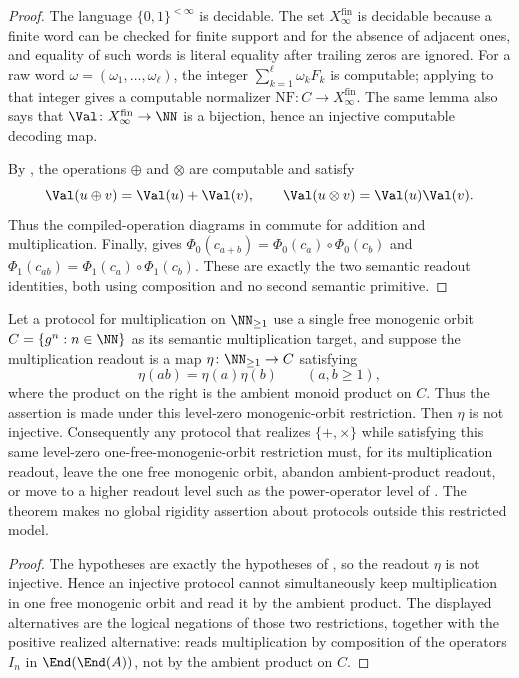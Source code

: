 \begin{proof}
The language \(\{0,1\}^{<\infty}\) is decidable.  The set
\(X_\infty^{\mathrm{fin}}\) is decidable because a finite word can be checked for
finite support and for the absence of adjacent ones, and equality of such words
is literal equality after trailing zeros are ignored.  For a raw word
\(\omega=(\omega_1,\ldots,\omega_\ell)\), the integer
\(\sum_{k=1}^{\ell}\omega_kF_k\) is computable; applying
 to that integer gives a computable
normalizer \(\mathrm{NF}\colon C\to X_\infty^{\mathrm{fin}}\).  The same lemma
also says that \(\Val\colon X_\infty^{\mathrm{fin}}\to\NN\) is a bijection, hence
an injective computable decoding map.

By , the operations \(\oplus\) and
\(\otimes\) are computable and satisfy
\[
  \Val(u\oplus v)=\Val(u)+\Val(v),
  \qquad
  \Val(u\otimes v)=\Val(u)\Val(v).
\]
Thus the compiled-operation diagrams in  commute for
addition and multiplication.  Finally,  gives
\(\Phi_0(c_{a+b})=\Phi_0(c_a)\circ\Phi_0(c_b)\) and
\(\Phi_1(c_{ab})=\Phi_1(c_a)\circ\Phi_1(c_b)\).  These are exactly the two
semantic readout identities, both using composition and no second semantic
primitive.
\end{proof}

\begin{theorem}
\label{thm:restricted-level-zero-protocol-dichotomy}
\label{cor:level-zero-protocol-dichotomy}
Let a protocol for multiplication on \(\NN_{\ge1}\) use a single free
monogenic orbit \(C=\{g^n:n\in\NN\}\) as its semantic multiplication target, and
suppose the multiplication readout is a map
\(\eta\colon\NN_{\ge1}\to C\) satisfying
\[
  \eta(ab)=\eta(a)\eta(b)
  \qquad(a,b\ge1),
\]
where the product on the right is the ambient monoid product on \(C\).  Thus
the assertion is made under this level-zero monogenic-orbit restriction.  Then
\(\eta\) is not injective.  Consequently any protocol that realizes
\(\{+,\times\}\) while satisfying this same level-zero one-free-monogenic-orbit
restriction must, for its multiplication readout, leave the one free monogenic
orbit, abandon ambient-product readout, or move to a higher readout level such
as the power-operator level of .  The theorem makes no
global rigidity assertion about protocols outside this restricted model.
\end{theorem}

\begin{proof}
The hypotheses are exactly the hypotheses of ,
so the readout \(\eta\) is not injective.  Hence an injective protocol cannot
simultaneously keep multiplication in one free monogenic orbit and read it by
the ambient product.  The displayed alternatives are the logical negations of
those two restrictions, together with the positive realized alternative:
 reads multiplication by composition of the operators
\(I_n\) in \(\End(\End(A))\), not by the ambient product on \(C\).
\end{proof}

